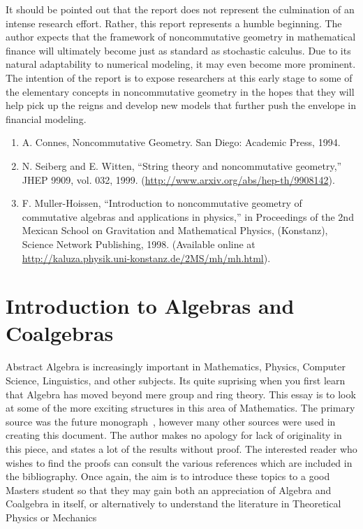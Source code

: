 \documentclass[preprint, 5p, 10pt]{elsarticle}
\theoremstyle{plain}
\begin{document}
It should be pointed out that the report does not represent the culmination of an intense research effort. Rather, this report represents a humble beginning. The author expects that the framework of noncommutative geometry in mathematical finance will ultimately become just as standard as stochastic calculus. Due to its natural adaptability to numerical modeling, it may even become more prominent. The intention of the report is to expose researchers at this early stage to some of the elementary concepts in noncommutative geometry in the hopes that they will help pick up the reigns and develop new models that further push the envelope in financial modeling.


\begin{enumerate}%
\item A. Connes, Noncommutative Geometry. San Diego: Academic Press, 1994.
\item N. Seiberg and E. Witten, ``{}String theory and noncommutative geometry,''{} JHEP 9909, vol. 032, 1999. (\url{http://www.arxiv.org/abs/hep-th/9908142}).
\item F. Muller-Hoissen, ``{}Introduction to noncommutative geometry of commutative algebras and applications in physics,''{} in Proceedings of the 2nd Mexican School on Gravitation and Mathematical Physics, (Konstanz), Science Network Publishing, 1998. (Available online at \url{http://kaluza.physik.uni-konstanz.de/2MS/mh/mh.html}).


\end{enumerate}
\section{Introduction to Algebras and Coalgebras}
Abstract Algebra is increasingly important in Mathematics, Physics, Computer Science, Linguistics, and other subjects.
Its quite suprising when you first learn that Algebra has moved beyond mere group and ring theory. 
This essay is to look at some of the more exciting structures in this area of Mathematics. 
The primary source was the future monograph~\cite{AlgebraicOperads}, however many other sources were
used in creating this document. The author makes no apology for lack of originality in this piece,
and states a lot of the results without proof. The interested reader who wishes to find the proofs
can consult the various references which are included in the bibliography.
Once again, the aim is to introduce these topics to a good Masters student so that they may gain both
an appreciation of Algebra and Coalgebra in itself, or alternatively to understand the literature
in Theoretical Physics or Mechanics~\cite{Ben-Aryeh2004,QuantumFieldsandStrings,QuantumGroups,Nielsen2000,GeometricPhasesinClassicalandQuantum,GeometryPhysicsTopology}
\end{document}
